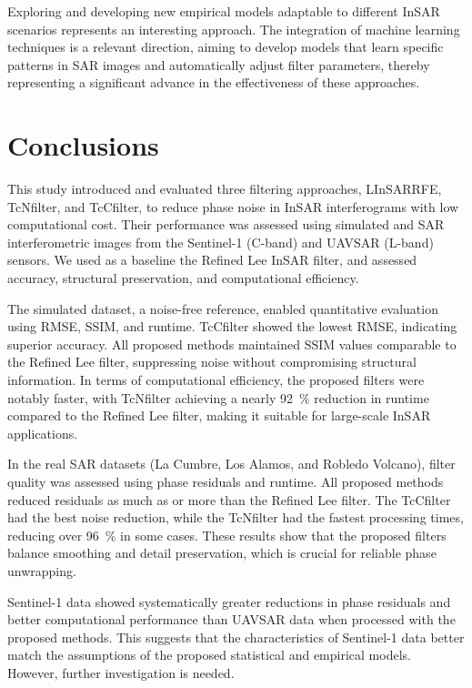 \documentclass[remotesensing,article,submit,pdftex,moreauthors]{Definitions/mdpi}
\begin{document}
Exploring and developing new empirical models adaptable to different InSAR scenarios represents an interesting approach. 
The integration of machine learning techniques is a relevant direction, aiming to develop models that learn specific patterns in SAR images and automatically adjust filter parameters, thereby representing a significant advance in the effectiveness of these approaches.

\section{Conclusions}\label{sec:conclusions}

This study introduced and evaluated three filtering approaches, LInSARRFE, TcNfilter, and TcCfilter, to reduce phase noise in InSAR interferograms with low computational cost. 
Their performance was assessed using simulated and SAR interferometric images from the Sentinel-1 (C-band) and UAVSAR (L-band) sensors. 
We used as a baseline the Refined Lee InSAR filter, and assessed accuracy, structural preservation, and computational efficiency.

The simulated dataset, a noise-free reference, enabled quantitative evaluation using RMSE, SSIM, and runtime. 
TcCfilter showed the lowest RMSE, indicating superior accuracy. 
All proposed methods maintained SSIM values comparable to the Refined Lee filter, suppressing noise without compromising structural information. 
In terms of computational efficiency, the proposed filters were notably faster, with TcNfilter achieving a nearly \qty{92}{\percent} reduction in runtime compared to the Refined Lee filter, making it suitable for large-scale InSAR applications.

In the real SAR datasets (La Cumbre, Los Alamos, and Robledo Volcano), filter quality was assessed using phase residuals and runtime. 
All proposed methods reduced residuals as much as or more than the Refined Lee filter. 
The TcCfilter had the best noise reduction, while the TcNfilter had the fastest processing times, reducing over \qty{96}{\percent} in some cases. 
These results show that the proposed filters balance smoothing and detail preservation, which is crucial for reliable phase unwrapping.

Sentinel-1 data showed systematically greater reductions in phase residuals and better computational performance than UAVSAR data when processed with the proposed methods. 
This suggests that the characteristics of Sentinel-1 data better match the assumptions of the proposed statistical and empirical models. 
However, further investigation is needed.
\end{document}
